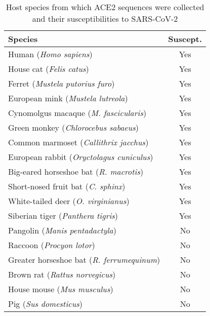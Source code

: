 \begin{table}[ht]
  \centering
  \begin{tabular}[t]{ l c }
    \hline
    \textbf{Species} & \textbf{Suscept.} \\
    \hline
    Human (\emph{Homo sapiens}) & Yes \\
    House cat (\emph{Felis catus}) & Yes\cite{Oude}\cite{deer} \\
    Ferret (\emph{Mustela putorius furo}) & Yes\cite{Oude} \\
    European mink (\emph{Mustela lutreola}) & Yes\cite{Oude}\cite{deer} \\
    Cynomolgus macaque (\emph{M. fascicularis}) & Yes\cite{Oude}\cite{Sreenivasan} \\
    Green monkey (\emph{Chlorocebus sabaeus}) & Yes\cite{Oude} \\
    Common marmoset (\emph{Callithrix jacchus}) & Yes\cite{Oude}\cite{Sreenivasan} \\
    European rabbit (\emph{Oryctolagus cuniculus}) & Yes\cite{Oude}\cite{Sreenivasan} \\
    Big-eared horseshoe bat (\emph{R. macrotis}) & Yes\cite{Oude} \\
    Short-nosed fruit bat (\emph{C. sphinx}) & Yes\cite{Oude}\cite{Sreenivasan} \\
    White-tailed deer (\emph{O. virginianus}) & Yes\cite{deer} \\
    Siberian tiger (\emph{Panthera tigris}) & Yes\cite{deer}\cite{tiger} \\
%
    Pangolin (\emph{Manis pentadactyla}) & No\cite{deer}\cite{pangolin} \\
    Raccoon (\emph{Procyon lotor}) & No\cite{Sreenivasan} \\
    Greater horseshoe bat (\emph{R. ferrumequinum}) & No\cite{Sreenivasan} \\
    Brown rat (\emph{Rattus norvegicus}) & No\cite{Sreenivasan} \\
    House mouse (\emph{Mus musculus}) & No\cite{Sreenivasan} \\
    Pig (\emph{Sus domesticus}) & No\cite{Oude}\cite{Sreenivasan} \\
    \hline
  \end{tabular}
  \caption{Host species from which ACE2 sequences were collected and their susceptibilities to SARS-CoV-2}
   \vspace{-8pt}
\end{table}
